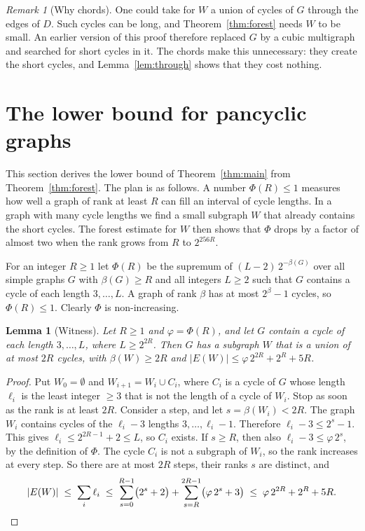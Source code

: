 \documentclass[11pt]{article}
\newtheorem{lemma}[theorem]{Lemma}
\theoremstyle{definition}
\theoremstyle{remark}
\newtheorem{remark}[theorem]{Remark}
\begin{document}
\begin{remark}[Why chords]\label{rem:chords}
One could take for $W$ a union of cycles of $G$ through the edges of $D$. Such cycles can be long,
and Theorem~\ref{thm:forest} needs $W$ to be small. An earlier version of this proof therefore
replaced $G$ by a cubic multigraph and searched for short cycles in it. The chords make this
unnecessary: they create the short cycles, and Lemma~\ref{lem:through} shows that they cost nothing.
\end{remark}
\section{The lower bound for pancyclic graphs}\label{sec:lower}

This section derives the lower bound of Theorem~\ref{thm:main} from Theorem~\ref{thm:forest}. The
plan is as follows. A number $\Phi(R)\le1$ measures how well a graph of rank at least $R$ can fill
an interval of cycle lengths. In a graph with many cycle lengths we find a small subgraph $W$ that
already contains the short cycles. The forest estimate for $W$ then shows that $\Phi$ drops by a
factor of almost two when the rank grows from $R$ to $2^{256R}$.

For an integer $R\ge1$ let $\Phi(R)$ be the supremum of $(L-2)\,2^{-\beta(G)}$ over all simple graphs
$G$ with $\beta(G)\ge R$ and all integers $L\ge2$ such that $G$ contains a cycle of each length
$3,\dots,L$. A graph of rank $\beta$ has at most $2^{\beta}-1$ cycles, so $\Phi(R)\le1$. Clearly
$\Phi$ is non-increasing.

\begin{lemma}[Witness]\label{lem:witness}
Let $R\ge1$ and $\varphi=\Phi(R)$, and let $G$ contain a cycle of each length $3,\dots,L$, where
$L\ge2^{2R}$. Then $G$ has a subgraph $W$ that is a union of at most $2R$ cycles, with
$\beta(W)\ge2R$ and $|E(W)|\le\varphi\,2^{2R}+2^{R}+5R$.
\end{lemma}

\begin{proof}
Put $W_0=\emptyset$ and $W_{i+1}=W_i\cup C_i$, where $C_i$ is a cycle of $G$ whose length $\ell_i$ is
the least integer $\ge3$ that is not the length of a cycle of $W_i$. Stop as soon as the rank is at
least $2R$. Consider a step, and let $s=\beta(W_i)<2R$. The graph $W_i$ contains cycles of the
$\ell_i-3$ lengths $3,\dots,\ell_i-1$. Therefore $\ell_i-3\le2^{s}-1$. This gives
$\ell_i\le2^{2R-1}+2\le L$, so $C_i$ exists. If $s\ge R$, then also $\ell_i-3\le\varphi\,2^{s}$, by
the definition of $\Phi$. The cycle $C_i$ is not a subgraph of $W_i$, so the rank increases at every
step. So there are at most $2R$ steps, their ranks $s$ are distinct, and
\[
  |E(W)|\;\le\;\sum_i\ell_i\;\le\;\sum_{s=0}^{R-1}\bigl(2^{s}+2\bigr)+\sum_{s=R}^{2R-1}\bigl(\varphi\,2^{s}+3\bigr)
  \;\le\;\varphi\,2^{2R}+2^{R}+5R .\qedhere
\]
\end{proof}
\end{document}
